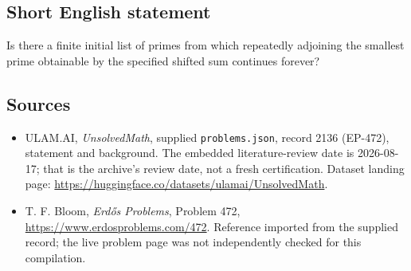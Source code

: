 \documentclass[11pt,a4paper]{article}
\begin{document}
\subsection{Short English statement}

Is there a finite initial list of primes from which repeatedly adjoining the smallest prime obtainable by the specified shifted sum continues forever?

\subsection{Sources}

{\small

\begin{itemize}

\item[\hypertarget{source:2136:1}{S1}] ULAM.AI, \emph{UnsolvedMath}, supplied \texttt{problems.json}, record 2136 (EP-472), statement and background. The embedded literature-review date is 2026-08-17; that is the archive’s review date, not a fresh certification. Dataset landing page: \url{https://huggingface.co/datasets/ulamai/UnsolvedMath}.

\item[\hypertarget{source:2136:2}{S2}] T. F. Bloom, \emph{Erdős Problems}, Problem 472, \url{https://www.erdosproblems.com/472}. Reference imported from the supplied record; the live problem page was not independently checked for this compilation.

\end{itemize}

}

\label{end:2136}
\end{document}
